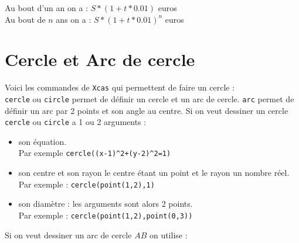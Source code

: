 \documentclass[a4paper,11pt]{book}
\begin{document}
\noindent Au bout d'un an on a : $S*(1+t*0.01)$ euros\\
Au bout de $n$ ans on a : $S*(1+t*0.01)^n$ euros\\
\section{Cercle et Arc de cercle}
Voici les commandes de {\tt Xcas} qui permettent de faire un cercle :\\
{\tt cercle} ou {\tt circle} permet de d\'efinir un cercle et un arc de cercle.
{\tt arc} permet de d\'efinir un arc par 2 points et son angle au centre.
 Si on veut dessiner un cercle {\tt cercle} ou {\tt circle} a 1 ou 2 arguments :
\begin{itemize}
\item son \'equation.\\ 
Par exemple {\tt cercle((x-1)\verb|^|2+(y-2)\verb|^|2=1)} 
\item son centre et son rayon le centre \'etant un point
et le rayon un nombre r\'eel.\\
Par exemple : {\tt cercle(point(1,2),1)}
\item son diam\`etre : les arguments sont alors 2 points.\\
Par exemple : {\tt cercle(point(1,2),point(0,3))}
\end{itemize}
Si on veut dessiner un arc de cercle $AB$ on utilise :
\end{document}
